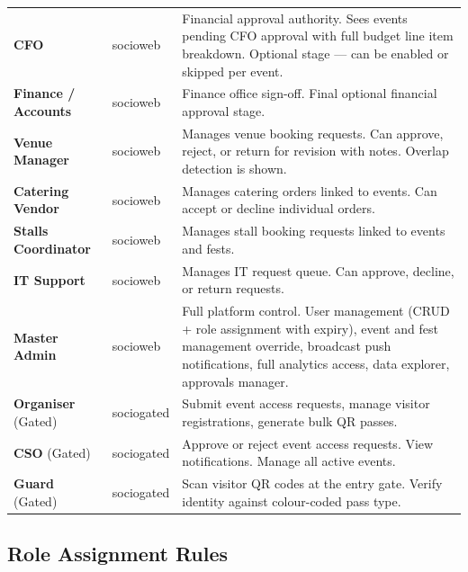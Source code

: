 \documentclass[12pt,a4paper]{article}
\begin{document}
\begin{longtable}{L{3.5cm} L{2.5cm} X}
\addlinespace
\textbf{CFO} & socioweb & Financial approval authority. Sees events pending CFO approval with full budget line item breakdown. Optional stage — can be enabled or skipped per event. \\
\addlinespace
\textbf{Finance / Accounts} & socioweb & Finance office sign-off. Final optional financial approval stage. \\
\addlinespace
\textbf{Venue Manager} & socioweb & Manages venue booking requests. Can approve, reject, or return for revision with notes. Overlap detection is shown. \\
\addlinespace
\textbf{Catering Vendor} & socioweb & Manages catering orders linked to events. Can accept or decline individual orders. \\
\addlinespace
\textbf{Stalls Coordinator} & socioweb & Manages stall booking requests linked to events and fests. \\
\addlinespace
\textbf{IT Support} & socioweb & Manages IT request queue. Can approve, decline, or return requests. \\
\addlinespace
\textbf{Master Admin} & socioweb & Full platform control. User management (CRUD + role assignment with expiry), event and fest management override, broadcast push notifications, full analytics access, data explorer, approvals manager. \\
\midrule
\textbf{Organiser} (Gated) & sociogated & Submit event access requests, manage visitor registrations, generate bulk QR passes. \\
\textbf{CSO} (Gated) & sociogated & Approve or reject event access requests. View notifications. Manage all active events. \\
\textbf{Guard} (Gated) & sociogated & Scan visitor QR codes at the entry gate. Verify identity against colour-coded pass type. \\
\bottomrule
\end{longtable}

\subsection{Role Assignment Rules}
\end{document}
